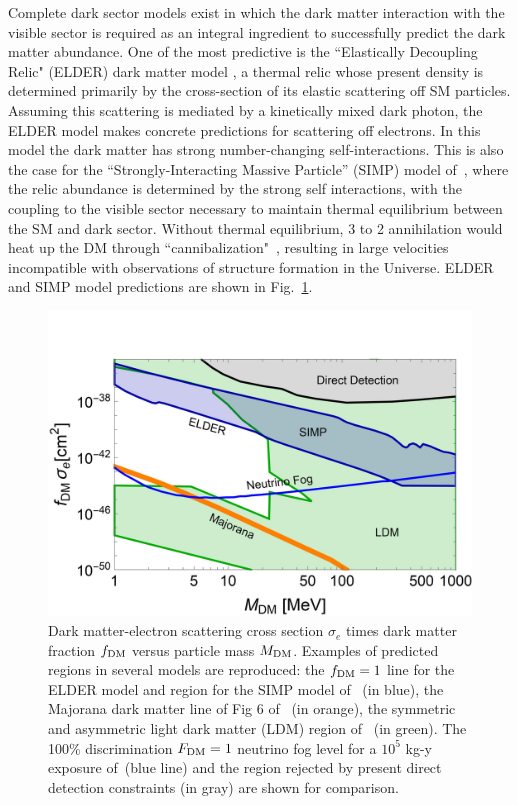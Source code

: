  Complete dark sector models exist in which the dark matter interaction with the visible sector is required as an integral ingredient to successfully predict the dark matter abundance. One of the most predictive is the ``Elastically Decoupling Relic" (ELDER) dark matter model \cite{Kuflik:2015isi, Kuflik:2017iqs}, a thermal relic whose present density is determined primarily by the cross-section of its elastic scattering off SM particles. Assuming this scattering is mediated by a kinetically mixed dark photon, the ELDER model makes concrete predictions for scattering off electrons. In this model the dark matter has strong number-changing self-interactions.  This is also the case for the “Strongly-Interacting Massive Particle” (SIMP) model of~\cite{Hochberg:2014dra}, where the relic abundance is determined by the strong self interactions, with the coupling to the visible sector necessary to maintain thermal equilibrium between the SM and dark sector. Without thermal equilibrium, 3 to 2 annihilation would heat up the DM through ``cannibalization"~\cite{Boddy:2014yra, Carlson:1992fn}, resulting in large velocities incompatible with observations of structure formation in the Universe. ELDER and SIMP model predictions are shown in Fig.~\ref{fig:sample_electron}.
 
\begin{figure}[t]
\begin{center}
\includegraphics[width=0.65\columnwidth]{figures/sigmae_plot.jpg}
\caption{Dark matter-electron scattering cross section $\sigma_e$ times dark matter fraction $f_{\rm DM}$ versus particle mass $M_{\rm DM}$. Examples of predicted regions in several models are reproduced: the
$f_{\rm DM}=1$ line for the ELDER model and region for the SIMP model of~\cite{Kuflik:2017iqs} (in blue), the Majorana dark matter line of Fig 6 of~\cite{Battaglieri:2017aum} (in orange), the symmetric and asymmetric light dark matter (LDM) region of~\cite{Lin:2011gj} (in green). The 100\% discrimination $F_{\rm DM } = 1$ neutrino fog level for a $10^5$ kg-y exposure of~\cite{Wyenberg:2018eyv}(blue line) and the region rejected by present direct detection constraints (in gray) are shown for comparison.}
\label{fig:sample_electron}
\end{center}
\end{figure}

